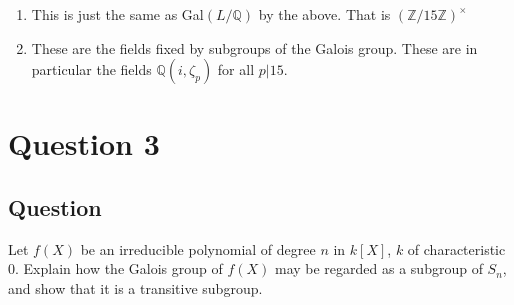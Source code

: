 \documentclass[11pt]{article}
\begin{document}
\begin{enumerate}
\begin{proof}
\[+ a' i ( \zeta_{15} -   \zeta_{15}^{14})+  b'  i( \zeta_{15}^2 -  \zeta_{15}^{13} ) + c'  i (\zeta_{15}^4 -  \zeta_{15}^{11})+ d'  i( \zeta_{15}^7 - \zeta_{15}^8 )+j + i j' )\] 
\[ 1  = a \Im (\zeta_{15} +  \zeta_{15}^{14} ) +  b \Im(   \zeta_{15}^2 +   \zeta_{15}^{13}) + c   \Im (\zeta_{15}^4+   \zeta_{15}^{11} )+ d \Im ( \zeta_{15}^7+  \zeta_{15}^8)\] 
\[+ a'  \Re ( \zeta_{15} -   \zeta_{15}^{14})+  b'  \Re( \zeta_{15}^2 -  \zeta_{15}^{13} ) + c'  \Re(\zeta_{15}^4 -  \zeta_{15}^{11})+ d'  \Re ( \zeta_{15}^7 - \zeta_{15}^8 ) ) +  j' \] 
\[ 1  =   j' \] 
Therefore, 
\[ 0 = a  (\zeta_{15} +  \zeta_{15}^{14} ) +  b(   \zeta_{15}^2 +   \zeta_{15}^{13}) + c  (\zeta_{15}^4+   \zeta_{15}^{11} )+ d ( \zeta_{15}^7+  \zeta_{15}^8)\] 
\[+ a' i ( \zeta_{15} -   \zeta_{15}^{14})+  b'  i( \zeta_{15}^2 -  \zeta_{15}^{13} ) + c'  i (\zeta_{15}^4 -  \zeta_{15}^{11})+ d'  i( \zeta_{15}^7 - \zeta_{15}^8 )+j \] 
Again, we exploit the fact that
\[ 0 = \Re( a  (\zeta_{15} +  \zeta_{15}^{14} ) +  b(   \zeta_{15}^2 +   \zeta_{15}^{13}) + c  (\zeta_{15}^4+   \zeta_{15}^{11} )+ d ( \zeta_{15}^7+  \zeta_{15}^8)\] 
\[+ a' i ( \zeta_{15} -   \zeta_{15}^{14})+  b'  i( \zeta_{15}^2 -  \zeta_{15}^{13} ) + c'  i (\zeta_{15}^4 -  \zeta_{15}^{11})+ d'  i( \zeta_{15}^7 - \zeta_{15}^8 )+j )\] 
\[ \Rightarrow -j = a  \Re (\zeta_{15} +  \zeta_{15}^{14} ) +  b \Re(   \zeta_{15}^2 +   \zeta_{15}^{13}) + c   \Re (\zeta_{15}^4+   \zeta_{15}^{11} )+ d \Re ( \zeta_{15}^7+  \zeta_{15}^8)\] 
\[+ a'  \Im ( \zeta_{15} -   \zeta_{15}^{14})+  b'  \Im ( \zeta_{15}^2 -  \zeta_{15}^{13} ) + c'  \Im  (\zeta_{15}^4 -  \zeta_{15}^{11})+ d'  \Im ( \zeta_{15}^7 - \zeta_{15}^8 ) .\]
However, this is equivalent to requiring that each coefficient be zero. Contradiction.
\end{proof}
\item This is just the same as Gal$(L/\mathbb{Q})$ by the above. That is $(\mathbb{Z}/15\mathbb{Z})^\times$
\item These are the fields fixed by subgroups of the Galois group. These are in particular the fields $\mathbb{Q}(i,\zeta_p)$ for all $p | 15$. 
\end{enumerate}

\section{Question 3}
\subsection{Question}
Let $f(X)$ be an irreducible polynomial of degree $n$ in $k[X]$, $k$ of characteristic 0. Explain how the Galois group of $f(X)$ may be regarded as a subgroup of $S_n$, and show that it is a transitive subgroup.
\end{document}
